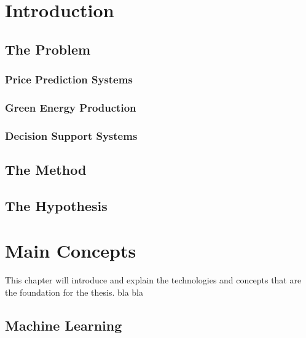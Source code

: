 \documentclass[twoside,11pt,openright]{report}
\begin{document}

\chapter{Introduction}
\label{ch:intro}
\section{The Problem}


\subsection{Price Prediction Systems}


\subsection{Green Energy Production}



\subsection{Decision Support Systems}


\section{The Method}


\section{The Hypothesis}




\chapter{Main Concepts}
This chapter will introduce and explain the technologies and concepts that are the foundation for the thesis. bla bla
\label{ch:foundations}
\section{Machine Learning}

\end{document}
